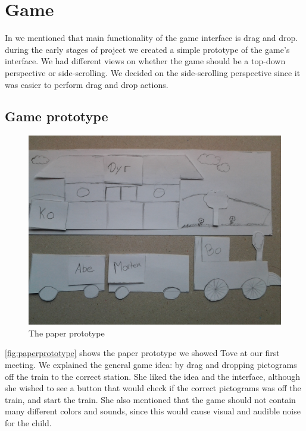 \section{Game}
In  we mentioned that main functionality of the game interface is drag and drop. during the early stages of project we created a simple prototype of the game's interface. We had different views on whether the game should be a top-down perspective or side-scrolling. We decided on the side-scrolling perspective since it was easier to perform drag and drop actions.

\subsection*{Game prototype}
\begin{figure}[H]
\centering
\includegraphics[width=0.9\linewidth]{img/screenshots/prototype1.jpg}%
\caption{The paper prototype}
\label{fig:paperprototype}
\end{figure}
\autoref{fig:paperprototype} shows the paper prototype we showed Tove at our first meeting. We explained the general game idea: by drag and dropping pictograms off the train to the correct station. She liked the idea and the interface, although she wished to see a button that would check if the correct pictograms was off the train, and start the train. She also mentioned that the game should not contain many different colors and sounds, since this would cause visual and audible noise for the child.	

